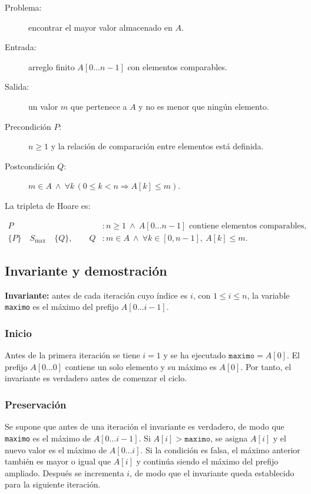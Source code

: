 \documentclass[12pt,letterpaper]{article}
\newcommand{\codigo}[1]{\texttt{#1}}
\begin{document}
\begin{description}
  \item[Problema:] encontrar el mayor valor almacenado en $A$.
  \item[Entrada:] arreglo finito $A[0\ldots n-1]$ con elementos comparables.
  \item[Salida:] un valor $m$ que pertenece a $A$ y no es menor que ningún elemento.
  \item[Precondición $P$:] $n\geq 1$ y la relación de comparación entre elementos está definida.
  \item[Postcondición $Q$:] $m\in A\ \land\ \forall k\,(0\leq k<n\Rightarrow A[k]\leq m)$.
\end{description}

La tripleta de Hoare es:

\begin{align*}
P &: n\geq1\ \land\ A[0\ldots n-1]\text{ contiene elementos comparables},\\
\{P\}\quad S_{\max}\quad\{Q\},\qquad
Q &: m\in A\ \land\ \forall k\in[0,n-1],\ A[k]\leq m.
\end{align*}

\subsection{Invariante y demostración}

\textbf{Invariante:} antes de cada iteración cuyo índice es $i$, con $1\leq i\leq n$, la variable \codigo{maximo} es el máximo del prefijo $A[0\ldots i-1]$.

\subsubsection{Inicio}

Antes de la primera iteración se tiene $i=1$ y se ha ejecutado $\codigo{maximo}=A[0]$. El prefijo $A[0\ldots0]$ contiene un solo elemento y su máximo es $A[0]$. Por tanto, el invariante es verdadero antes de comenzar el ciclo.

\subsubsection{Preservación}

Se supone que antes de una iteración el invariante es verdadero, de modo que \codigo{maximo} es el máximo de $A[0\ldots i-1]$. Si $A[i]>\codigo{maximo}$, se asigna $A[i]$ y el nuevo valor es el máximo de $A[0\ldots i]$. Si la condición es falsa, el máximo anterior también es mayor o igual que $A[i]$ y continúa siendo el máximo del prefijo ampliado. Después se incrementa $i$, de modo que el invariante queda establecido para la siguiente iteración.
\end{document}
